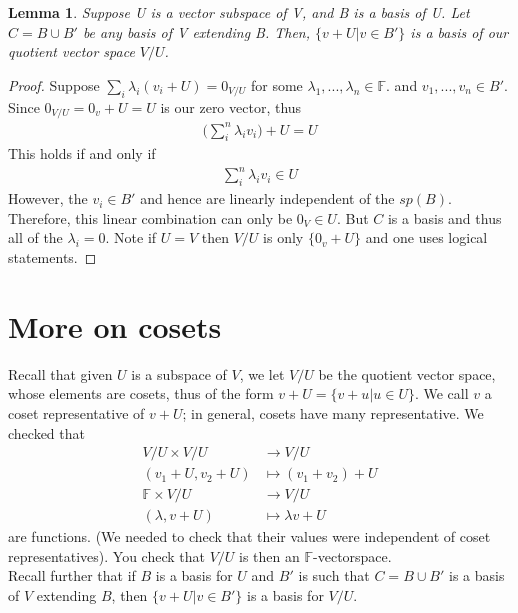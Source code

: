 \documentclass[a4paper, 11pt]{article}
\newtheorem*{lemma}{Lemma}
\newcommand{\F}{\mathbb{F}}
\begin{document}
	\begin{lemma}
		Suppose U is a vector subspace of V, and B is a basis of U. Let $C = B\cup B'$ be any basis of V extending B. Then, $\{v+U | v \in B'\}$ is a basis of our quotient vector space $V/U$. 
	\end{lemma}
	\begin{proof}
		Suppose $\sum_i \lambda_i (v_i+U) = 0_{V/U}$ for some $\lambda_1,..., \lambda_n \in \F$. and $v_1, ... , v_n \in B'$. Since $0_{V/U} = 0_v + U = U$ is our zero vector, thus
			\begin{align*}
				\Big(\sum_i^n \lambda_i v_i\Big) + U = U
			\end{align*} 
		This holds if and only if 
			\begin{align*}
				\sum_i^n \lambda_i v_i \in U
			\end{align*}
		However, the $v_i\in B'$ and hence are linearly independent of the $sp(B)$. Therefore, this linear combination can only be $0_V\in U$. But $C$ is a basis and thus all of the $\lambda_i=0$. Note if $U=V$ then $V/U$ is only $\{0_v + U\}$ and one uses logical statements. 
	\end{proof}

\section*{More on cosets}
	\noindent Recall that given $U$ is a subspace of $V$, we let $V/U$ be the quotient vector space, whose elements are cosets, thus of the form $v+U = \{ v+u|u\in U \}$. We call $v$ a coset representative of $v+U$; in general, cosets have many representative. We checked that 
		\begin{align*}
			V/U \times V/U &\to V/U \\ 
			(v_1+U, v_2+U)&\mapsto (v_1+v_2)+U\\
			\F \times V/U &\to V/U \\ 
			(\lambda, v+U)&\mapsto \lambda v+U
		\end{align*}
	are functions. (We needed to check that their values were independent of coset representatives). You check that $V/U$ is then an $\F$-vectorspace.  \\ 
	
	\noindent Recall further that if $B$ is a basis for $U$ and $B'$ is such that $C=B\cup B'$ is a basis of $V$ extending $B$, then $\{v+U | v\in B'\}$ is a basis for $V/U$. 
	
\end{document}
